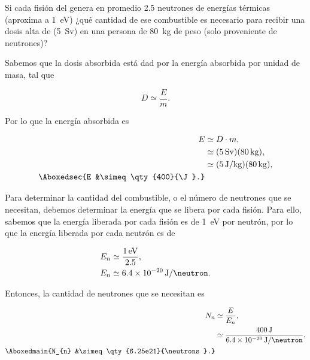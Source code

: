 \documentclass[./../main.tex]{subfiles}
\begin{document}
	\begin{exercise}
		Si cada fisión del  genera en promedio 2.5 neutrones de energías térmicas (aproxima a \qty{1}{\eV}) ¿qué cantidad de ese combustible es necesario para recibir una dosis alta de (\qty{5}{\sievert}) en una persona de \qty{80}{\kg} de peso (solo proveniente de neutrones)?

		\begin{solution}
			Sabemos que la dosis absorbida está dad por la energía absorbida por unidad de masa, tal que
			
			\begin{equation*}
				D \simeq \dfrac{E}{m}.
			\end{equation*}

			Por lo que la energía absorbida es

			\begin{align*}
				E &\simeq D \cdot m,\\
				&\simeq (\qty{5}{\sievert})(\qty{80}{\kg}),\\
				&\simeq (\qty[per-mode=symbol]{5}{\J\per\kg})(\qty{80}{\kg}),\\
				\Aboxedsec{E &\simeq \qty{400}{\J}.}
			\end{align*}

			Para determinar la cantidad del combustible, o el número de neutrones que se necesitan, debemos determinar la energía que se libera por cada fisión. Para ello, sabemos que la energía liberada por cada fisión es de \qty{1}{\eV} por neutrón, por lo que la energía liberada por cada neutrón es de

			\begin{align*}
				E_{n} &\simeq \dfrac{\qty{1}{\eV}}{2.5},\\
				E_{n} &\simeq \qty[per-mode=symbol]{6.4e-20}{\J\per\neutron}.
			\end{align*}

			Entonces, la cantidad de neutrones que se necesitan es

			\begin{align*}
				N_{n} &\simeq \dfrac{E}{E_{n}},\\
				&\simeq \dfrac{\qty{400}{\J}}{\qty{6.4e-20}{\J\per\neutron}},\\
				\Aboxedmain{N_{n} &\simeq \qty{6.25e21}{\neutrons}.}
			\end{align*}
		\end{solution}
	\end{exercise}
\end{document}
